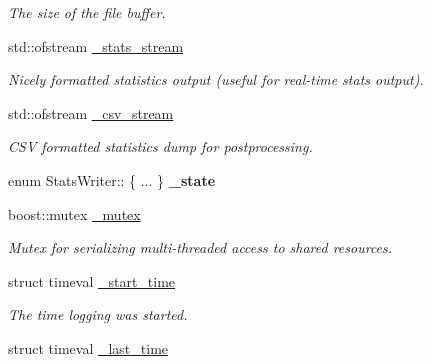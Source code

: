 \begin{DoxyCompactItemize}
\begin{DoxyCompactList}\small\item\em The size of the file buffer. \end{DoxyCompactList}\item 
\hypertarget{class_stats_writer_a7d02d23a29de9b857dfb62aae1d3b582}{
std::ofstream \hyperlink{class_stats_writer_a7d02d23a29de9b857dfb62aae1d3b582}{\_\-stats\_\-stream}}
\label{class_stats_writer_a7d02d23a29de9b857dfb62aae1d3b582}

\begin{DoxyCompactList}\small\item\em Nicely formatted statistics output (useful for real-\/time stats output). \end{DoxyCompactList}\item 
\hypertarget{class_stats_writer_acb81199559faed7e79448ebb651d2250}{
std::ofstream \hyperlink{class_stats_writer_acb81199559faed7e79448ebb651d2250}{\_\-csv\_\-stream}}
\label{class_stats_writer_acb81199559faed7e79448ebb651d2250}

\begin{DoxyCompactList}\small\item\em CSV formatted statistics dump for postprocessing. \end{DoxyCompactList}\item 
\hypertarget{class_stats_writer_a9b9dc8d05db5a5dcd3631153745baee8}{
enum StatsWriter:: \{ ... \}  {\bfseries \_\-state}}
\label{class_stats_writer_a9b9dc8d05db5a5dcd3631153745baee8}

\item 
\hypertarget{class_stats_writer_a865eb25303ebb19dc34d3e450d30474e}{
boost::mutex \hyperlink{class_stats_writer_a865eb25303ebb19dc34d3e450d30474e}{\_\-mutex}}
\label{class_stats_writer_a865eb25303ebb19dc34d3e450d30474e}

\begin{DoxyCompactList}\small\item\em Mutex for serializing multi-\/threaded access to shared resources. \end{DoxyCompactList}\item 
\hypertarget{class_stats_writer_ac159e087049dd1d5270feafe55c9466e}{
struct timeval \hyperlink{class_stats_writer_ac159e087049dd1d5270feafe55c9466e}{\_\-start\_\-time}}
\label{class_stats_writer_ac159e087049dd1d5270feafe55c9466e}

\begin{DoxyCompactList}\small\item\em The time logging was started. \end{DoxyCompactList}\item 
\hypertarget{class_stats_writer_a2cf8cdd745d5ae13acd677889aaf8158}{
struct timeval \hyperlink{class_stats_writer_a2cf8cdd745d5ae13acd677889aaf8158}{\_\-last\_\-time}}
\label{class_stats_writer_a2cf8cdd745d5ae13acd677889aaf8158}


\end{DoxyCompactItemize}
